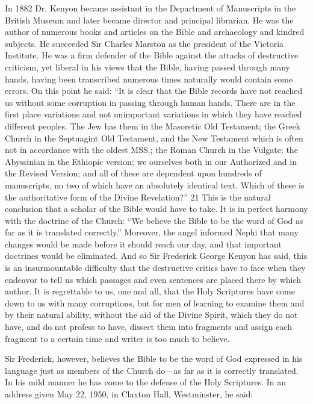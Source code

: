 In 1882 Dr. Kenyon became assistant in the Department of Manuscripts in the British
Museum and later became director and principal librarian. He was the author of numerous
books and articles on the Bible and archaeology and kindred subjects. He succeeded Sir
Charles Marston as the president of the Victoria Institute. He was a firm defender of the
Bible against the attacks of destructive criticism, yet liberal in his views that the Bible,
having passed through many hands, having been transcribed numerous times naturally would
contain some errors. On this point he said: ``It is clear that the Bible records have not reached
us without some corruption in passing through human hands. There are in the first place
variations and not unimportant variations in which they have reached different peoples. The
Jew has them in the Masoretic Old Testament; the Greek Church in the Septuagint Old
Testament, and the New Testament which is often not in accordance with the oldest MSS.;
the Roman Church in the Vulgate; the Abyssinian in the Ethiopic version; we ourselves both
in our Authorized and in the Revised Version; and all of these are dependent upon hundreds
of manuscripts, no two of which have an absolutely identical text. Which of these is the
authoritative form of the Divine Revelation?'' 21 This is the natural conclusion that a scholar
of the Bible would have to take. It is in perfect harmony with the doctrine of the Church:
``We believe the Bible to be the word of God as far as it is translated correctly.'' Moreover,
the angel informed Nephi that many changes would be made before it should reach our day,
and that important doctrines would be eliminated. And so Sir Frederick George Kenyon has
said, this is an insurmountable difficulty that the destructive critics have to face when they
endeavor to tell us which passages and even sentences are placed there by which author. It is
regrettable to us, one and all, that the Holy Scriptures have come down to us with many
corruptions, but for men of learning to examine them and by their natural ability, without the
aid of the Divine Spirit, which they do not have, and do not profess to have, dissect them into
fragments and assign each fragment to a certain time and writer is too much to believe.

Sir Frederick, however, believes the Bible to be the word of God expressed in his language
just as members of the Church do—as far as it is correctly translated. In his mild manner he
has come to the defense of the Holy Scriptures. In an address given May 22, 1950, in Claxton
Hall, Westminster, he said:

